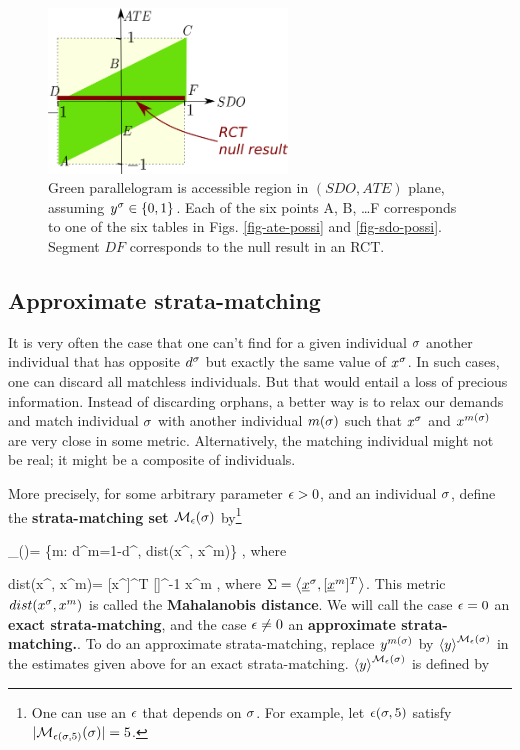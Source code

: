\begin{figure}[h!]
\centering
\includegraphics[width=2.5in]
{pot-out/sdo-ate-polytope.png}
\caption{
Green parallelogram
is accessible region in
$(SDO,ATE)$ plane,
assuming $y^\sigma\in \{0,1\}$.
Each of the
six points A, B, \ldots F
corresponds to one of the six tables
in Figs. \ref{fig-ate-possi}
and \ref{fig-sdo-possi}.
Segment $DF$
corresponds to the null
result in an RCT.
}
\label{fig-sdo-ate-polytope}
\end{figure}



\subsection{Approximate   strata-matching}

It is very often
the case that
one can't
find for a given
individual $\sigma$
another individual that has
opposite $ d^\sigma$ but
exactly the same value of $x^\sigma$.
In such cases, one can discard all
matchless individuals.
But that would entail a loss
of precious information.
Instead of discarding orphans,
a better way is to
relax our demands and
match individual $\sigma$
with another individual $m(\sigma)$
such that $x^\sigma$
and $x^{m(\sigma)}$ are very
close in some metric.
Alternatively, the matching
individual might
not be real; it might
be a composite
of individuals.

More precisely,
for some arbitrary
parameter $\epsilon>0$,
and an individual $\sigma$,
define
the {\bf  strata-matching set}
${\cal M}_{\epsilon}(\sigma)$ by\footnote{
One can use an $\epsilon$
that depends on $\sigma$.
For example, let $\epsilon(\sigma, 5)$
satisfy
$|{\cal M}_{\epsilon(\sigma, 5)}(\sigma)|=5$.}

\beq
\calm_{\eps}(\s)=
\{m:  d^m=1-d^\s,
dist(x^\s, x^m)\leq \eps \}
\;,
\eeq
where

\beq
dist(x^\s, x^m)=
[x^\s]^T [\Sigma]^{-1} x^m
\;,
\eeq
where $\Sigma = \av{\rvx^\s, [\rvx^m]^T}$.
 This
metric $dist(x^\sigma, x^m)$ is
called the {\bf Mahalanobis distance}.
We will call
the case $\epsilon=0$ an {\bf  exact   strata-matching},
and
the case
$\epsilon\neq 0$
 an {\bf approximate   strata-matching.}.
To do an approximate   strata-matching,
replace $y^{m(\sigma)}$
by
$\left\langle y\right\rangle^{{\cal M}_\epsilon(\sigma)}$
in
the estimates
given above
for an exact   strata-matching.
$\left\langle y\right\rangle^{{\cal M}_\epsilon(\sigma)}$
is defined by

